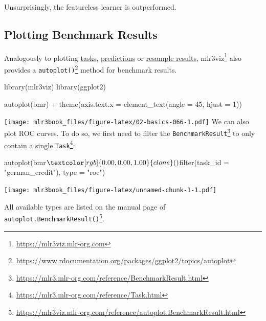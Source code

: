 \documentclass[12pt,]{scrbook}
\newenvironment{Shaded}{}{}
\newcommand{\DataTypeTok}[1]{#1}
\newcommand{\DecValTok}[1]{#1}
\newcommand{\KeywordTok}[1]{\textcolor[rgb]{0.00,0.00,1.00}{#1}}
\newcommand{\NormalTok}[1]{#1}
\newcommand{\OperatorTok}[1]{#1}
\newcommand{\StringTok}[1]{\textcolor[rgb]{0.00,0.50,0.50}{#1}}
\renewcommand{\href}[2]{#2\footnote{\url{#1}}}
\begin{document}
Unsurprisingly, the featureless learner is outperformed.

\hypertarget{autoplot-benchmarkresult}{%
\subsection{Plotting Benchmark Results}\label{autoplot-benchmarkresult}}

Analogously to plotting \protect\hyperlink{autoplot-task}{tasks}, \protect\hyperlink{autoplot-prediction}{predictions} or \protect\hyperlink{autoplot-resampleresult}{resample results}, \href{https://mlr3viz.mlr-org.com}{mlr3viz} also provides a \href{https://www.rdocumentation.org/packages/ggplot2/topics/autoplot}{\texttt{autoplot()}} method for benchmark results.

\begin{Shaded}
\begin{Highlighting}[]
\KeywordTok{library}\NormalTok{(mlr3viz)}
\KeywordTok{library}\NormalTok{(ggplot2)}

\KeywordTok{autoplot}\NormalTok{(bmr) }\OperatorTok{+}\StringTok{ }\KeywordTok{theme}\NormalTok{(}\DataTypeTok{axis.text.x =} \KeywordTok{element_text}\NormalTok{(}\DataTypeTok{angle =} \DecValTok{45}\NormalTok{, }
  \DataTypeTok{hjust =} \DecValTok{1}\NormalTok{))}
\end{Highlighting}
\end{Shaded}

\texttt{[image: mlr3book\_files/figure-latex/02-basics-066-1.pdf]}
We can also plot ROC curves.
To do so, we first need to filter the \href{https://mlr3.mlr-org.com/reference/BenchmarkResult.html}{\texttt{BenchmarkResult}} to only contain a single \href{https://mlr3.mlr-org.com/reference/Task.html}{\texttt{Task}}:

\begin{Shaded}
\begin{Highlighting}[]
\KeywordTok{autoplot}\NormalTok{(bmr}\OperatorTok{$}\KeywordTok{clone}\NormalTok{()}\OperatorTok{$}\KeywordTok{filter}\NormalTok{(}\DataTypeTok{task_id =} \StringTok{"german_credit"}\NormalTok{), }\DataTypeTok{type =} \StringTok{"roc"}\NormalTok{)}
\end{Highlighting}
\end{Shaded}

\texttt{[image: mlr3book\_files/figure-latex/unnamed-chunk-1-1.pdf]}

All available types are listed on the manual page of \href{https://mlr3viz.mlr-org.com/reference/autoplot.BenchmarkResult.html}{\texttt{autoplot.BenchmarkResult()}}.
\end{document}
